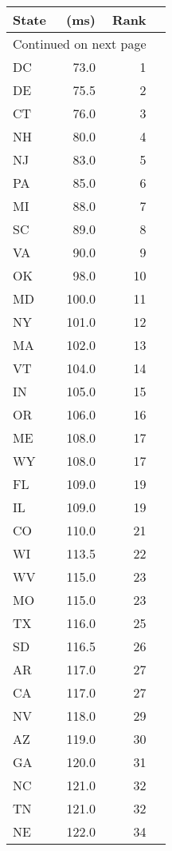 \begin{longtable}{lrrr}
\toprule
State &  (ms) &  Rank \\
\midrule
\endhead
\midrule
\multicolumn{3}{r}{{Continued on next page}} \\
\midrule
\endfoot

\bottomrule
\endlastfoot
DC    &    73.0 &     1 \\
DE    &    75.5 &     2 \\
CT    &    76.0 &     3 \\
NH    &    80.0 &     4 \\
NJ    &    83.0 &     5 \\
PA    &    85.0 &     6 \\
MI    &    88.0 &     7 \\
SC    &    89.0 &     8 \\
VA    &    90.0 &     9 \\
OK    &    98.0 &    10 \\
MD    &   100.0 &    11 \\
NY    &   101.0 &    12 \\
MA    &   102.0 &    13 \\
VT    &   104.0 &    14 \\
IN    &   105.0 &    15 \\
OR    &   106.0 &    16 \\
ME    &   108.0 &    17 \\
WY    &   108.0 &    17 \\
FL    &   109.0 &    19 \\
IL    &   109.0 &    19 \\
CO    &   110.0 &    21 \\
WI    &   113.5 &    22 \\
WV    &   115.0 &    23 \\
MO    &   115.0 &    23 \\
TX    &   116.0 &    25 \\
SD    &   116.5 &    26 \\
AR    &   117.0 &    27 \\
CA    &   117.0 &    27 \\
NV    &   118.0 &    29 \\
AZ    &   119.0 &    30 \\
GA    &   120.0 &    31 \\
NC    &   121.0 &    32 \\
TN    &   121.0 &    32 \\
NE    &   122.0 &    34 \\

\end{longtable}
